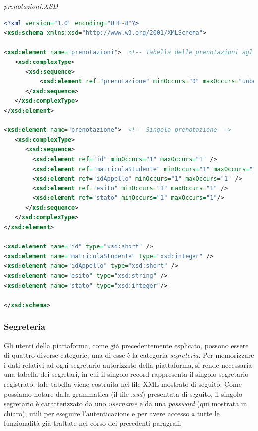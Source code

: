 \documentclass [a4paper,11pt]{book}
\begin{document}
\emph{prenotazioni.XSD}

\begin{lstlisting}[language=XML]
<?xml version="1.0" encoding="UTF-8"?>
<xsd:schema xmlns:xsd="http://www.w3.org/2001/XMLSchema">

<xsd:element name="prenotazioni">  <!-- Tabella delle prenotazioni agli appelli -->
   <xsd:complexType> 
      <xsd:sequence>
	      <xsd:element ref="prenotazione" minOccurs="0" maxOccurs="unbounded" />
      </xsd:sequence>
   </xsd:complexType>
</xsd:element>

<xsd:element name="prenotazione">  <!-- Singola prenotazione -->
   <xsd:complexType> 
      <xsd:sequence>
        <xsd:element ref="id" minOccurs="1" maxOccurs="1" /> 
        <xsd:element ref="matricolaStudente" minOccurs="1" maxOccurs="1" />
        <xsd:element ref="idAppello" minOccurs="1" maxOccurs="1" /> 
        <xsd:element ref="esito" minOccurs="1" maxOccurs="1" /> 
        <xsd:element ref="stato" minOccurs="1" maxOccurs="1"/>
      </xsd:sequence>
   </xsd:complexType>
</xsd:element>

<xsd:element name="id" type="xsd:short" />
<xsd:element name="matricolaStudente" type="xsd:integer" />
<xsd:element name="idAppello" type="xsd:short" />
<xsd:element name="esito" type="xsd:string" />
<xsd:element name="stato" type="xsd:integer"/>

</xsd:schema>
\end{lstlisting}

\medskip

\subsubsection{Segreteria}

Gli utenti della piattaforma, come già precedentemente esplicato, possono essere di quattro diverse categorie; una di esse è la categoria \emph{segreteria}. Per memorizzare i dati relativi ad ogni segretario autorizzato della piattaforma, si rende necessaria una tabella dei segretari, in cui il singolo record rappresenta il singolo segretario registrato; tale tabella viene costruita nel file XML mostrato di seguito. Come possiamo notare dalla grammatica (il file \emph{.xsd}) presentata di seguito, il singolo segretario è caratterizzato da uno \emph{username} e da una \emph{password} (qui mostrata in chiaro), utili per eseguire l'autenticazione e per avere accesso a tutte le funzionalità già trattate nel corso dei precedenti paragrafi.

\medskip
\end{document}
